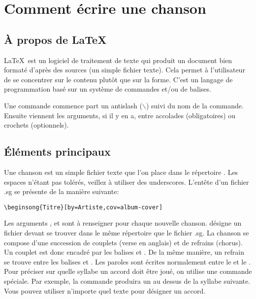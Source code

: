 \documentclass[versionenligne]{framabook}
\begin{document}
\section{Comment écrire une chanson}

\subsection{À propos de \LaTeX\,}

\LaTeX\, est un logiciel de traitement de texte qui produit un document
bien formaté d'après des sources (un simple fichier texte). Cela
permet à l'utilisateur de se concentrer sur le contenu plutôt que sur
la forme. C'est un langage de programmation basé sur un système de
commandes et/ou de balises.

Une commande commence part un antislash ($\backslash$) suivi du nom
de la commande. Ensuite viennent les arguments, si il y en a, entre
accolades (obligatoires) ou crochets (optionnels).

\subsection{Éléments principaux}

Une chanson est un simple fichier texte  que l'on
place dans le répertoire . Les espaces n'étant
pas tolérés, veillez à utiliser des underscores. L'entête d'un fichier
.sg se présente de la manière suivante:

\begin{verbatim}
\beginsong{Titre}[by=Artiste,cov=album-cover]
\end{verbatim}

Les arguments ,  et  sont
à renseigner pour chaque nouvelle chanson.  désigne
un fichier  devant se trouver dans le même
répertoire que le fichier .sg.  La chanson se compose d'une succession
de couplets (verse en anglais) et de refrains (chorus). Un couplet est
donc encadré par les balises  et . De
la même manière, un refrain se trouve entre les balises
 et .  Les paroles sont écrites
normalement entre le  et le . Pour
préciser sur quelle syllabe un accord doit être joué, on utilise une
commande spéciale. Par exemple, la commande \latexcom{[Mi]} produira
un  au dessus de la syllabe suivante. Vous pouvez utiliser n'importe
quel texte pour désigner un accord.
\end{document}
